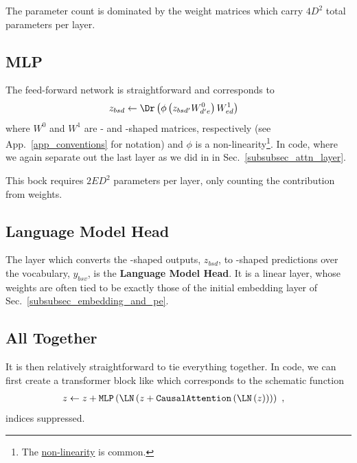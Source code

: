 \documentclass[11pt]{article}
\begin{document}
The parameter count is dominated by the weight matrices which carry $ 4 D ^{ 2 } $ total parameters
per layer.


\subsection{MLP \label{subsubsec_mlp} }

The feed-forward network is straightforward and corresponds to
\begin{align}
	z _{ bsd } & \leftarrow \Dr \left (\phi \left ( z _{ bsd' }W ^{ 0 }_{ d'e } \right ) W ^{ 1 } _{ ed
	} \right ) \label{eq_mlp}
\end{align}
where $ W ^{ 0 } $ and $ W ^{ 1 } $ are - and -shaped matrices,
respectively (see App.~\ref{app_conventions} for notation) and $ \phi $ is a
non-linearity\footnote{The 
	\href{https://pytorch.org/docs/stable/generated/torch.nn.GELU.html}{non-linearity} is common.}.
In code, where we again separate out the last  layer as we did in in
Sec.~\ref{subsubsec_attn_layer}.  

This bock requires $ 2 E D ^{ 2 } $ parameters per layer, only counting the contribution from
weights.


\subsection{Language Model Head \label{subsubsec_language_model_head} }


The layer which converts the -shaped outputs, $ z _{ bsd } $, to -shaped
predictions over the vocabulary, $  y _{ bsv } $, is the \textbf{Language Model Head}. It
is a linear layer, whose weights are often tied to be exactly those of the initial embedding
layer of Sec.~\ref{subsubsec_embedding_and_pe}.


\subsection{All Together}
It is then relatively straightforward to tie everything together.  In code, we can first create a
transformer block like
which corresponds to the schematic function
\begin{align}
	z & \leftarrow  z + \texttt{MLP}\left ( \LN \left ( z + \texttt{CausalAttention}\left ( \LN \left (
				z\right ) \right )  \right ) \right )\ ,
\end{align}
indices suppressed.
\end{document}
